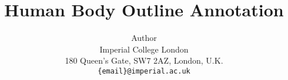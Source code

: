 \title{Human Body Outline Annotation}

\author{Author\\
Imperial College London\\
180 Queen’s Gate, SW7 2AZ, London, U.K.\\
{\tt\small \{email\}@imperial.ac.uk}}


